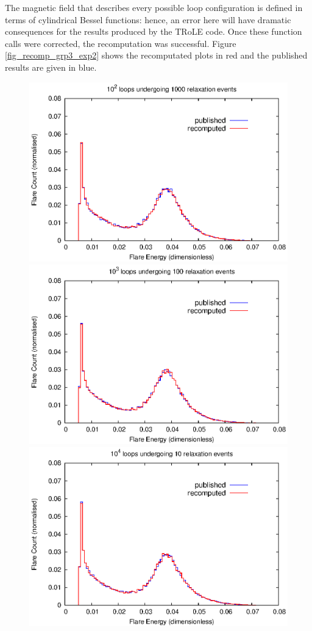 The magnetic field that describes every possible loop configuration is defined in terms of cylindrical Bessel functions: hence, an error here will have dramatic consequences for the results produced by the TRoLE code. Once these function calls were corrected, the recomputation was successful. Figure \ref{fig_recomp_grp3_exp2} shows the recomputated plots in red and the published results are given in blue.
\begin{figure}[h!] 
  \vspace{-5pt}
  \center
  \includegraphics[scale=0.35]{../Group_3/wrpf_rx10e5_lle3.eps}
  \includegraphics[scale=0.35]{../Group_3/wrpf_rx10e5_lle2.eps}
  \includegraphics[scale=0.35]{../Group_3/wrpf_rx10e5_lle1.eps}

\end{figure}
